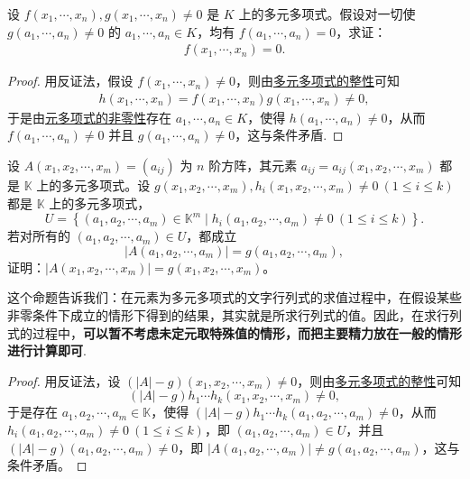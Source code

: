 \documentclass[../../main.tex]{subfiles}%
\begin{document}
\begin{example}
设 \(f(x_1,\cdots ,x_n), g(x_1,\cdots ,x_n) \ne 0\) 是 \(K\) 上的多元多项式。假设对一切使 \(g(a_1,\cdots ,a_n) \ne 0\) 的 \(a_1,\cdots ,a_n \in K\)，均有 \(f(a_1,\cdots ,a_n) = 0\)，求证：
\begin{align*}
f(x_1,\cdots ,x_n) = 0.
\end{align*}
\end{example}
\begin{proof}
用反证法，假设 \(f(x_1,\cdots ,x_n) \ne 0\)，则由\hyperref[proposition:多元多项式的整性]{多元多项式的整性}可知
\begin{align*}
h(x_1,\cdots ,x_n) = f(x_1,\cdots ,x_n) g(x_1,\cdots ,x_n) \ne 0,
\end{align*}
于是由\hyperref[lemma:多元多项式的非零性]{元多项式的非零性}存在 \(a_1,\cdots ,a_n \in K\)，使得 \(h(a_1,\cdots ,a_n) \ne 0\)，从而\(f(a_1,\cdots ,a_n) \ne 0\) 并且 \(g(a_1,\cdots ,a_n) \ne 0\)，这与条件矛盾.
\end{proof}

\begin{proposition}
设 $A(x_1, x_2, \cdots, x_m) = (a_{ij})$ 为 $n$ 阶方阵，其元素 $a_{ij} = a_{ij}(x_1, x_2, \cdots, x_m)$ 都是 $\mathbb{K}$ 上的多元多项式。设 $g(x_1, x_2, \cdots, x_m), h_i(x_1, x_2, \cdots, x_m) \neq 0 \ (1 \leqslant  i \leqslant  k)$都是 $\mathbb{K}$ 上的多元多项式，
\[
U = \left\{ (a_1, a_2, \cdots, a_m) \in \mathbb{K}^m \mid h_i(a_1, a_2, \cdots, a_m) \neq 0 \ (1 \leqslant  i \leqslant  k) \right\}.
\]
若对所有的 $(a_1, a_2, \cdots, a_m) \in U$，都成立
\[
|A(a_1, a_2, \cdots, a_m)| = g(a_1, a_2, \cdots, a_m),
\]
证明：$|A(x_1, x_2, \cdots, x_m)| = g(x_1, x_2, \cdots, x_m)$。
\end{proposition}
\begin{note}
这个命题告诉我们：在元素为多元多项式的文字行列式的求值过程中，在假设某些非零条件下成立的情形下得到的结果，其实就是所求行列式的值。因此，在求行列式的过程中，\textbf{可以暂不考虑未定元取特殊值的情形，而把主要精力放在一般的情形进行计算即可}.
\end{note}
\begin{proof}
用反证法，设 $(|A| - g)(x_1, x_2, \cdots, x_m) \neq 0$，则由\hyperref[lemma:多元多项式的整性]{多元多项式的整性}可知
\[
(|A| - g)h_1 \cdots h_k (x_1, x_2, \cdots, x_m) \neq 0,
\]
于是存在 $a_1, a_2, \cdots, a_m \in \mathbb{K}$，使得 $(|A| - g)h_1 \cdots h_k (a_1, a_2, \cdots, a_m) \neq 0$，从而 $h_i(a_1, a_2, \cdots, a_m) \neq 0 \ (1 \leqslant  i \leqslant  k)$，即 $(a_1, a_2, \cdots, a_m) \in U$，并且 $(|A| - g)(a_1, a_2, \cdots, a_m) \neq 0$，即 $|A(a_1, a_2, \cdots, a_m)| \neq g(a_1, a_2, \cdots, a_m)$，这与条件矛盾。
\end{proof}
\end{document}
